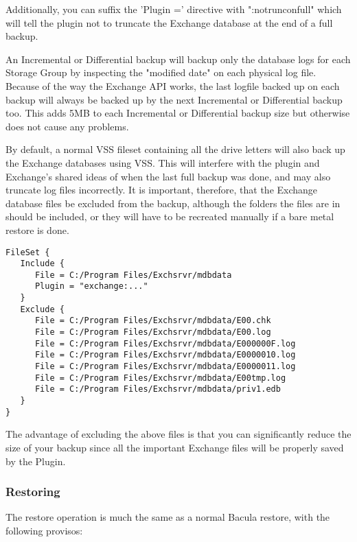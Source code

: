 Additionally, you can suffix the 'Plugin =' directive with
":notrunconfull" which will tell the plugin not to truncate the Exchange
database at the end of a full backup.

An Incremental or Differential backup will backup only the database logs
for each Storage Group by inspecting the "modified date" on each
physical log file. Because of the way the Exchange API works, the last
logfile backed up on each backup will always be backed up by the next
Incremental or Differential backup too. This adds 5MB to each
Incremental or Differential backup size but otherwise does not cause any
problems.

By default, a normal VSS fileset containing all the drive letters will
also back up the Exchange databases using VSS. This will interfere with
the plugin and Exchange's shared ideas of when the last full backup was
done, and may also truncate log files incorrectly. It is important,
therefore, that the Exchange database files be excluded from the backup,
although the folders the files are in should be included, or they will
have to be recreated manually if a bare metal restore is done.

\begin{verbatim}
FileSet {
   Include {
      File = C:/Program Files/Exchsrvr/mdbdata
      Plugin = "exchange:..."
   }
   Exclude {
      File = C:/Program Files/Exchsrvr/mdbdata/E00.chk
      File = C:/Program Files/Exchsrvr/mdbdata/E00.log
      File = C:/Program Files/Exchsrvr/mdbdata/E000000F.log
      File = C:/Program Files/Exchsrvr/mdbdata/E0000010.log
      File = C:/Program Files/Exchsrvr/mdbdata/E0000011.log
      File = C:/Program Files/Exchsrvr/mdbdata/E00tmp.log
      File = C:/Program Files/Exchsrvr/mdbdata/priv1.edb
   }
}
\end{verbatim}

The advantage of excluding the above files is that you can significantly
reduce the size of your backup since all the important Exchange files
will be properly saved by the Plugin.


\subsubsection{Restoring}
The restore operation is much the same as a normal Bacula restore, with
the following provisos:

